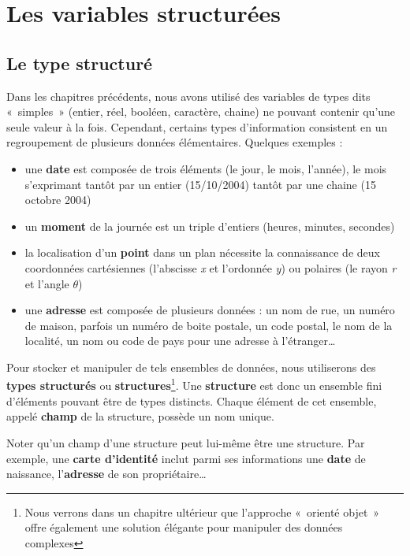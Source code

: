 \chapter{Les variables structurées}
\section{Le type structuré}
{
Dans les chapitres précédents, nous avons utilisé des variables de types
dits «~simples~» (entier, réel, booléen, caractère, chaine) ne pouvant
contenir qu’une seule valeur à la fois. Cependant, certains types
d’information consistent en un regroupement de plusieurs données
élémentaires. Quelques exemples :}

\liststyleListv
\begin{itemize}
\item {
une \textbf{date} est composée de trois éléments (le jour, le mois,
l’année), le mois s’exprimant tantôt par un entier (15/10/2004) tantôt
par une chaine (15 octobre 2004)}
\item {
un \textbf{moment} de la journée est un triple d’entiers (heures,
minutes, secondes)}
\item {
la localisation d’un \textbf{point} dans un plan nécessite la
connaissance de deux coordonnées cartésiennes (l’abscisse \textit{x} et
l’ordonnée \textit{y}) ou polaires (le rayon \textit{r} et l’angle
\textit{$\theta $})}
\item {
une \textbf{adresse }est composée de plusieurs données : un nom de rue,
un numéro de maison, parfois un numéro de boite postale, un code
postal, le nom de la localité, un nom ou code de pays pour une adresse
à l’étranger…}
\end{itemize}
{
Pour stocker et manipuler de tels ensembles de données, nous utiliserons
des \textbf{types structurés} ou \textbf{structures}\footnote{Nous
verrons dans un chapitre ultérieur que l'approche
«~orienté objet~» offre également une solution élégante pour manipuler
des données complexes}. Une \textbf{structure} est donc un ensemble
fini d’éléments pouvant être de types distincts. Chaque élément de cet
ensemble, appelé \textbf{champ} de la structure, possède un nom unique.
}

{
Noter qu’un champ d’une structure peut lui-même être une structure. Par
exemple, une \textbf{carte d’identité} inclut parmi ses informations
une \textbf{date} de naissance, l’\textbf{adresse} de son
propriétaire…}


\bigskip


\bigskip


